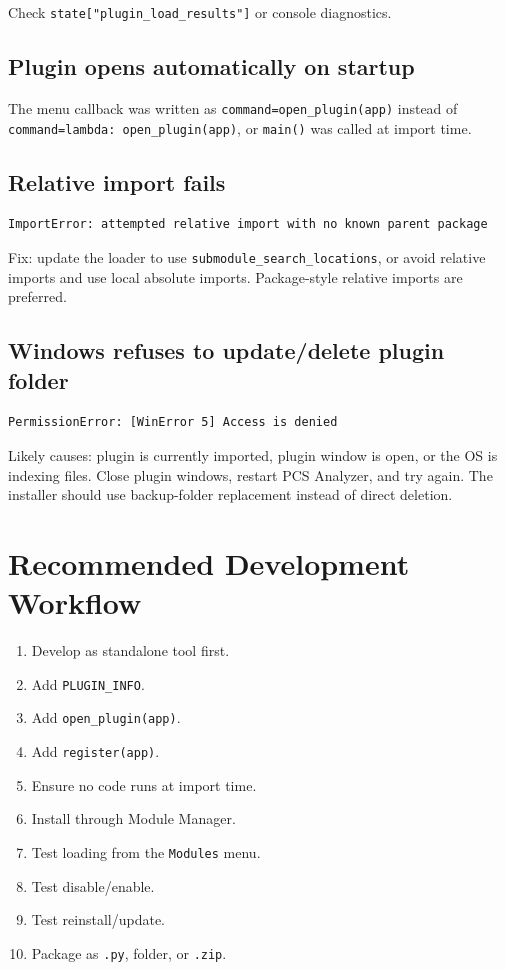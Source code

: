 \documentclass[11pt, a4paper]{article}
\begin{document}
Check \texttt{state["plugin\_load\_results"]} or console diagnostics.

\subsection{Plugin opens automatically on startup}

The menu callback was written as \texttt{command=open\_plugin(app)} instead of \texttt{command=lambda: open\_plugin(app)}, or \texttt{main()} was called at import time.

\subsection{Relative import fails}

\begin{lstlisting}[style=text]
ImportError: attempted relative import with no known parent package
\end{lstlisting}

Fix: update the loader to use \texttt{submodule\_search\_locations}, or avoid relative imports and use local absolute imports. Package-style relative imports are preferred.

\subsection{Windows refuses to update/delete plugin folder}

\begin{lstlisting}[style=text]
PermissionError: [WinError 5] Access is denied
\end{lstlisting}

Likely causes: plugin is currently imported, plugin window is open, or the OS is indexing files. Close plugin windows, restart PCS Analyzer, and try again. The installer should use backup-folder replacement instead of direct deletion.

\section{Recommended Development Workflow}

\begin{enumerate}
  \item Develop as standalone tool first.
  \item Add \texttt{PLUGIN\_INFO}.
  \item Add \texttt{open\_plugin(app)}.
  \item Add \texttt{register(app)}.
  \item Ensure no code runs at import time.
  \item Install through Module Manager.
  \item Test loading from the \texttt{Modules} menu.
  \item Test disable/enable.
  \item Test reinstall/update.
  \item Package as \texttt{.py}, folder, or \texttt{.zip}.
\end{enumerate}
\end{document}
